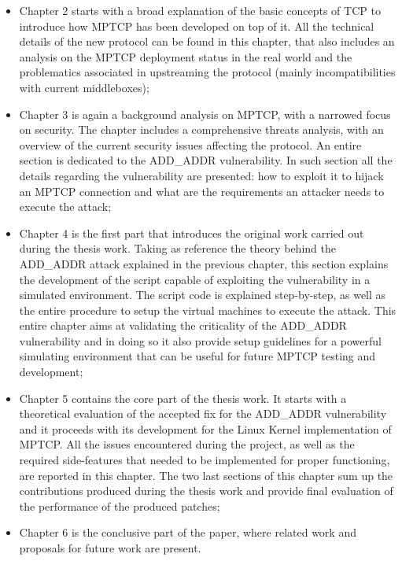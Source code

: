 \begin{itemize}
  \item Chapter 2 starts with a broad explanation of the basic concepts of TCP to introduce how MPTCP has been developed on top of it. All the technical details of the new protocol can be found in this chapter, that also includes an analysis on the MPTCP deployment status in the real world and the problematics associated in upstreaming the protocol (mainly incompatibilities with current middleboxes);
  \item Chapter 3 is again a background analysis on MPTCP, with a narrowed focus on security. The chapter includes a comprehensive threats analysis, with an overview of the current security issues affecting the protocol. An entire section is dedicated to the ADD\_ADDR vulnerability. In such section all the details regarding the vulnerability are presented: how to exploit it to hijack an MPTCP connection and what are the requirements  an attacker needs to execute the attack;
  \item Chapter 4 is the first part that introduces the original work carried out during the thesis work. Taking as reference the theory behind the ADD\_ADDR attack explained in the previous chapter, this section explains the development of the script capable of exploiting the vulnerability in a simulated environment. The script code is explained step-by-step, as well as the entire procedure to setup the virtual machines to execute the attack. This entire chapter aims at validating the criticality of the ADD\_ADDR vulnerability and in doing so it also provide setup guidelines for a powerful simulating environment that can be useful for future MPTCP testing and development;
  \item Chapter 5 contains the core part of the thesis work. It starts with a theoretical evaluation of the accepted fix for the ADD\_ADDR vulnerability and it proceeds with its development for the Linux Kernel implementation of MPTCP. All the issues encountered during the project, as well as the required side-features that needed to be implemented for proper functioning, are reported in this chapter. The two last sections of this chapter sum up the contributions produced during the thesis work and provide final evaluation of the performance of the produced patches;
  \item Chapter 6 is the conclusive part of the paper, where related work and proposals for future work are present.
\end{itemize}